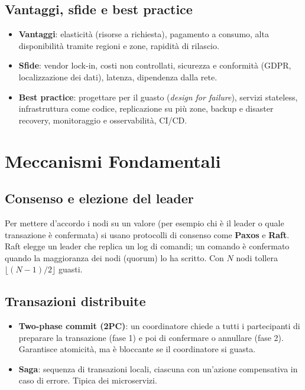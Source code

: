 \subsection{Vantaggi, sfide e best practice}
\begin{itemize}
    \item \textbf{Vantaggi}: elasticità (risorse a richiesta), pagamento a consumo, alta disponibilità tramite regioni e zone, rapidità di rilascio.
    \item \textbf{Sfide}: vendor lock-in, costi non controllati, sicurezza e conformità (GDPR, localizzazione dei dati), latenza, dipendenza dalla rete.
    \item \textbf{Best practice}: progettare per il guasto (\emph{design for failure}), servizi stateless, infrastruttura come codice, replicazione su più zone, backup e disaster recovery, monitoraggio e osservabilità, CI/CD.
\end{itemize}

\section{Meccanismi Fondamentali}

\subsection{Consenso e elezione del leader}
Per mettere d'accordo i nodi su un valore (per esempio chi è il leader o quale transazione è confermata) si usano protocolli di consenso come \textbf{Paxos} e \textbf{Raft}. Raft elegge un leader che replica un log di comandi; un comando è confermato quando la maggioranza dei nodi (quorum) lo ha scritto. Con $N$ nodi tollera $\lfloor (N-1)/2 \rfloor$ guasti.

\subsection{Transazioni distribuite}
\begin{itemize}
    \item \textbf{Two-phase commit (2PC)}: un coordinatore chiede a tutti i partecipanti di preparare la transazione (fase 1) e poi di confermare o annullare (fase 2). Garantisce atomicità, ma è bloccante se il coordinatore si guasta.
    \item \textbf{Saga}: sequenza di transazioni locali, ciascuna con un'azione compensativa in caso di errore. Tipica dei microservizi.
\end{itemize}

